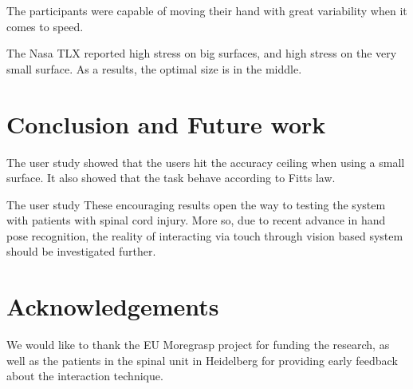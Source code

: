 \documentclass{chi-ext}
\begin{document}
The participants were capable of moving their hand with great variability when it comes to speed.

The Nasa TLX reported high stress on big surfaces, and high stress on the very small surface. As a results, the optimal size is in the middle.


\section{Conclusion and Future work}


The user study showed that the users hit the accuracy ceiling when using a small surface. It also showed that the task behave according to Fitts law.

The user study These encouraging results open the way to testing the system with patients with spinal cord injury. More so, due to recent advance in hand pose recognition, the reality of interacting via touch through vision based system should be investigated further.

\section{Acknowledgements}
We would like to thank the EU Moregrasp project for funding the research, as well as the patients in the spinal unit in Heidelberg for providing early feedback about the interaction technique.


\newpage

\balance


\end{document}
